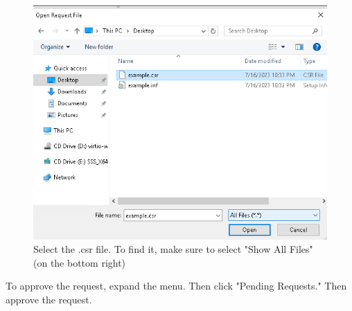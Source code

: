 \documentclass{article}
\begin{document}
\begin{figure}[H]
        \centering
        \includegraphics[width=1\textwidth]{SelectAllFiles.png}
        \caption{Select the .csr file. To find it, make sure to select "Show All Files" (on the bottom right)}
        \label{fig:ShowAllFiles}
\end{figure}

To approve the request, expand the menu. Then click "Pending Requests." Then approve the request.
\end{document}
